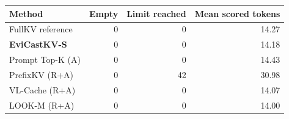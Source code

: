 \begin{tabular}{lrrr}
\toprule
Method & Empty & Limit reached & Mean scored tokens\\
\midrule
FullKV reference & 0 & 0 & 14.27\\
\textbf{EviCastKV-S} & 0 & 0 & 14.18\\
Prompt Top-K (A) & 0 & 0 & 14.43\\
PrefixKV (R+A) & 0 & 42 & 30.98\\
VL-Cache (R+A) & 0 & 0 & 14.07\\
LOOK-M (R+A) & 0 & 0 & 14.00\\
\bottomrule
\end{tabular}

